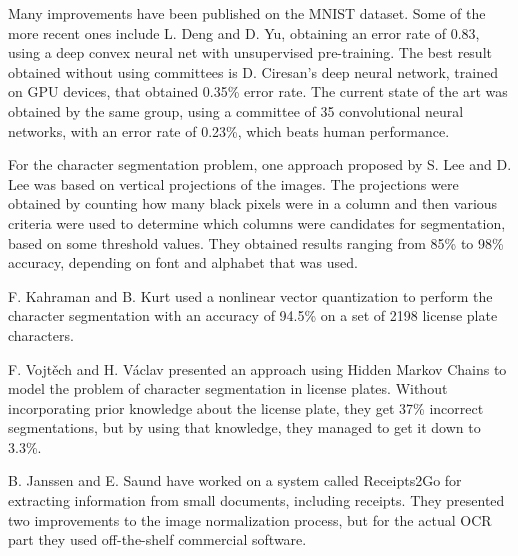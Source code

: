Many improvements have been published on the MNIST dataset. Some of the more recent ones include L. Deng and D. Yu\cite{deng2011deep}, obtaining an error rate of 0.83, using a deep convex neural net with unsupervised pre-training. The best result obtained without using committees is D. Ciresan's deep neural network, trained on GPU devices\cite{Cire_an_2010}, that obtained 0.35\% error rate. The current state of the art was obtained by the same group, using a committee of 35 convolutional neural networks, with an error rate of 0.23\%, which beats human performance\cite{2012arXiv1202.2745C}. 

For the character segmentation problem, one approach proposed by S. Lee and D. Lee\cite{Dong_June_Lee} was based on vertical projections of the images. The projections were obtained by counting how many black pixels were in a column and then various criteria were used to determine which columns were candidates for segmentation, based on some threshold values. They obtained results ranging from 85\% to 98\% accuracy, depending on font and alphabet that was used. 

F. Kahraman and B. Kurt used a nonlinear vector quantization to perform the character segmentation\cite{kahraman2003license} with an accuracy of 94.5\% on a set of 2198 license plate characters. 

F. Vojtěch and H. Václav presented an approach using Hidden Markov Chains to model the problem of character segmentation in license plates. Without incorporating prior knowledge about the license plate, they get 37\% incorrect segmentations, but by using that knowledge, they managed to get it down to 3.3\%\cite{Franc_2005}.

B. Janssen and E. Saund have worked on a system called Receipts2Go\cite{janssen2012receipts2go} for extracting information from small documents, including receipts. They presented two improvements to the image normalization process, but for the actual OCR part they used off-the-shelf commercial software. 